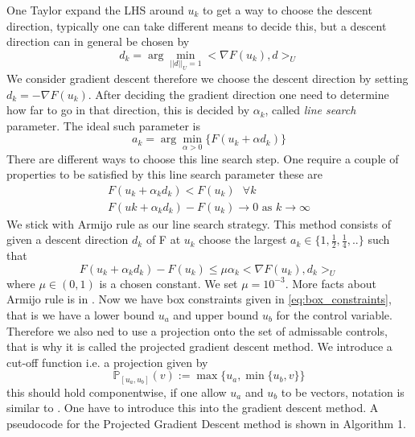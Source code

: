 One Taylor expand the LHS around $u_k$ to get a way to choose the descent direction, typically one can take different means to decide this, but a descent direction can in general be chosen by 
\begin{equation*}
    d_k = \arg \min _{||d||_U=1} <\nabla F(u_k), d>_U
\end{equation*}
We consider gradient descent therefore we choose the descent direction by setting $d_k = -\nabla F(u_k)$. After deciding the gradient direction one need to determine how far to go in that direction, this is decided by $\alpha_k$, called \textit{line search} parameter. The ideal such parameter is 
\begin{equation*}
    a_k = \arg \min_{\alpha>0} \{ F(u_k + \alpha d_k) \}
\end{equation*}
There are different ways to choose this line search step. One require a couple of properties to be satisfied by this line search parameter these are
\begin{align*}
    F(u_k + \alpha_kd_k) < F(u_k) \text{  } \forall k \\
    F(uk + \alpha_k d_k) - F(u_k) \rightarrow 0 \text{ as } k\rightarrow \infty
\end{align*}
We stick with Armijo rule as our line search strategy. This method consists of given a descent direction $d_k$ of F at $u_k$ choose the largest $a_k \in \{ 1, \frac{1}{2},\frac{1}{4},.. \}$ such that
\begin{equation*}
    F(u_k + \alpha_kd_k) - F(u_k) \leq \mu \alpha_k <\nabla F(u_k),d_k>_U
\end{equation*}
where $\mu \in (0,1)$ is a chosen constant. We set $\mu = 10^{-3}$. More facts about Armijo rule is in \cite{numMethods}. Now we have box constraints given in \eqref{eq:box_constraints}, that is we have a lower bound $u_a$ and upper bound $u_b$ for the control variable. Therefore we also ned to use a projection onto the set of admissable controls, that is why it is called the projected gradient descent method. We introduce a cut-off function i.e. a projection given by
\begin{equation}
    \label{eq:projection}
    \mathbb{P}_{[u_a,u_b]}(v) := \max \{u_a, \min \{u_b,v \} \}
\end{equation}
this should hold componentwise, if one allow $u_a$ and $u_b$ to be vectors, notation is similar to \cite{Algorithms}. One have to introduce this into the gradient descent method. A pseudocode for the Projected Gradient Descent method is shown in Algorithm 1. 


